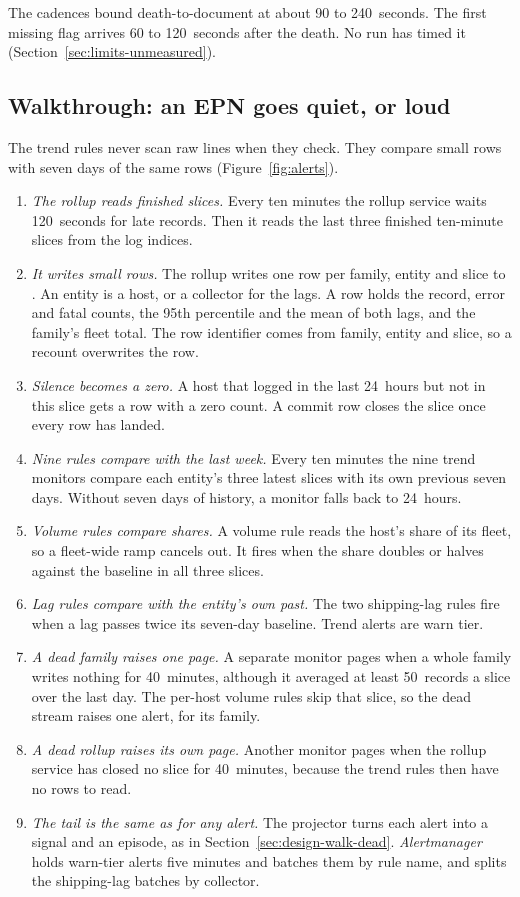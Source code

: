 The cadences bound death-to-document at about 90 to 240~seconds. The first missing flag arrives 60 to 120~seconds after the death. No run has timed it (Section~\ref{sec:limits-unmeasured}).

\subsection{Walkthrough: an EPN goes quiet, or loud}\label{sec:design-walk-trend}

The trend rules never scan raw lines when they check. They compare small rows with seven days of the same rows (Figure~\ref{fig:alerts}).

\begin{enumerate}[itemsep=3pt]
\item \emph{The rollup reads finished slices.} Every ten minutes the rollup service waits 120~seconds for late records. Then it reads the last three finished ten-minute slices from the log indices.
\item \emph{It writes small rows.} The rollup writes one row per family, entity and slice to . An entity is a host, or a collector for the lags. A row holds the record, error and fatal counts, the 95th percentile and the mean of both lags, and the family's fleet total. The row identifier comes from family, entity and slice, so a recount overwrites the row.
\item \emph{Silence becomes a zero.} A host that logged in the last 24~hours but not in this slice gets a row with a zero count. A commit row closes the slice once every row has landed.
\item \emph{Nine rules compare with the last week.} Every ten minutes the nine trend monitors compare each entity's three latest slices with its own previous seven days. Without seven days of history, a monitor falls back to 24~hours.
\item \emph{Volume rules compare shares.} A volume rule reads the host's share of its fleet, so a fleet-wide ramp cancels out. It fires when the share doubles or halves against the baseline in all three slices.
\item \emph{Lag rules compare with the entity's own past.} The two shipping-lag rules fire when a lag passes twice its seven-day baseline. Trend alerts are warn tier.
\item \emph{A dead family raises one page.} A separate monitor pages when a whole family writes nothing for 40~minutes, although it averaged at least 50~records a slice over the last day. The per-host volume rules skip that slice, so the dead stream raises one alert, for its family.
\item \emph{A dead rollup raises its own page.} Another monitor pages when the rollup service has closed no slice for 40~minutes, because the trend rules then have no rows to read.
\item \emph{The tail is the same as for any alert.} The projector turns each alert into a signal and an episode, as in Section~\ref{sec:design-walk-dead}. \textit{Alertmanager} holds warn-tier alerts five minutes and batches them by rule name, and splits the shipping-lag batches by collector.
\end{enumerate}

